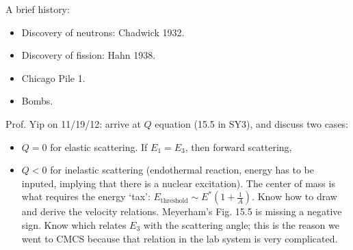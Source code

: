 \documentclass{school-22.101-notes}
\begin{document}
A brief history: 
\begin{itemize}
\item Discovery of neutrons: Chadwick 1932. 
\item Discovery of fission: Hahn 1938. 
\item Chicago Pile 1. 
\item Bombs. 
\end{itemize}

Prof. Yip on 11/19/12: arrive at $Q$ equation (15.5 in SY3), and discuss two cases: 
\begin{itemize}
\item $Q = 0$ for elastic scattering. If $E_1 = E_3$, then forward scattering, 
\item $Q < 0$ for inelastic scattering (endothermal reaction, energy has to be inputed, implying that there is a nuclear excitation). The center of mass is what requires the energy `tax': $E_{\mathrm{threshold}} \sim E^* \left( 1 + \frac{1}{A} \right)$.   Know how to draw and derive the velocity relations. Meyerham's Fig. 15.5 is missing a negative sign. Know
  which relates $E_3$ with the scattering angle; this is the reason we went to CMCS because that relation in the lab system is very complicated. 
\end{itemize}
\end{document}
